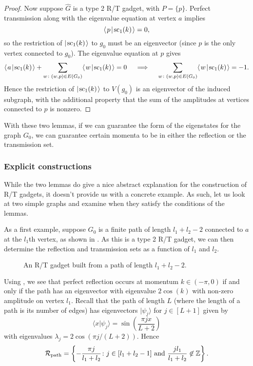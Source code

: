 \documentclass[../thesis-main/thesis-main]{subfiles}
\begin{document}
\begin{proof}
Now suppose $\widehat{G}$ is a type 2 R/T gadget, with $P = \{p\}$.  Perfect transmission along with the eigenvalue equation at vertex $a$ implies
\begin{equation}
\langle\mspace{2mu} p \mspace{2mu} | \mspace{2mu} \text{sc}_1(k)\mspace{2mu} \rangle = 0,
\end{equation}
so the restriction of $|\mspace{2mu} \text{sc}_1(k) \mspace{2mu} \rangle$ to $g_0$ must be an eigenvector (since $p$ is the only vertex connected to $g_0$).  The eigenvalue equation at $p$ gives
\begin{equation}
  \langle\mspace{2mu} a \mspace{2mu} | \mspace{2mu} \text{sc}_1(k)\mspace{2mu} \rangle 
  + \sum_{w \colon (w,p)\in E(G_0)} \langle\mspace{2mu} w \mspace{2mu} | \mspace{2mu} \text{sc}_1(k)\mspace{2mu} \rangle = 0 
  \quad\implies\quad
  \sum_{w \colon (w,p)\in E(G_0)} \langle\mspace{2mu} w \mspace{2mu} | \mspace{2mu} \text{sc}_1(k)\mspace{2mu} \rangle = -1.
\end{equation}
Hence the restriction of $|\mspace{2mu} \text{sc}_1(k) \mspace{2mu} \rangle$ to $V(g_0)$ is an eigenvector of the induced subgraph, with the additional property that the sum of the amplitudes at vertices connected to $p$ is nonzero.
\end{proof}

With these two lemmas, if we can guarantee the form of the eigenstates for the graph $G_0$, we can guarantee certain momenta to be in either the reflection or the transmission set.


\subsubsection{Explicit constructions}\label{sec:rt_ex}

While the two lemmas do give a nice abstract explanation for the construction of R/T gadgets, it doesn't provide us with a concrete example. As such, let us look at two simple graphs and examine when they satisfy the conditions of the lemmas.

As a first example, suppose $G_0$ is a finite path of length $l_1+l_2-2$ connected to $a$ at the $l_1$th vertex, as shown in .  As this is a type 2 R/T gadget, we can then determine the reflection and transmission sets as a function of $l_1$ and $l_2$.


\begin{figure}
  \centering
  
  \caption{An R/T gadget built from a path of length $l_1+l_2-2$. }
  \label{fig:RT_path}
\end{figure}


Using , we see that perfect reflection occurs at momentum $k\in (-\pi,0)$ if and only if the path has an eigenvector with eigenvalue $2\cos(k)$ with non-zero amplitude on vertex $l_1$.  Recall that the path of length $L$ (where the length of a path is its number of edges) has eigenvectors $|\psi_j\rangle$ for $j\in [L+1]$ given by
\begin{equation}
  \langle x | \psi_j \rangle = \sin\left(\frac{ \pi j x}{L+2}\right)\label{eq:vecs_line}
\end{equation}
with eigenvalues $\lambda_j = 2 \cos(\pi j/(L+2))$.  Hence
\begin{equation}
  \mathcal{R}_{\mathrm{path}} = \left\{ -\frac{\pi j}{l_1 + l_2} \colon j\in [l_1 + l_2 - 1] \text{ and } \frac{jl_1}{l_1+l_2} \not\in \mathbb{Z}\right\}.
\end{equation}
\end{document}
